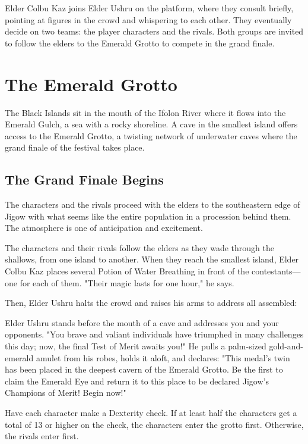 \documentclass[10pt,a4paper,twoside,fancy,bg=print,twocolumn,openany,nodeprecatedcode]{dndbook}
\begin{document}
Elder Colbu Kaz joins Elder Ushru on the platform, where they consult briefly, pointing at figures in the crowd and whispering to each other. They eventually decide on two teams: the player characters and the rivals. Both groups are invited to follow the elders to the Emerald Grotto to compete in the grand finale.

\section{The Emerald Grotto}
The Black Islands sit in the mouth of the Ifolon River where it flows into the Emerald Gulch, a sea with a rocky shoreline. A cave in the smallest island offers access to the Emerald Grotto, a twisting network of underwater caves where the grand finale of the festival takes place.

\subsection{The Grand Finale Begins}
The characters and the rivals proceed with the elders to the southeastern edge of Jigow with what seems like the entire population in a procession behind them. The atmosphere is one of anticipation and excitement.

The characters and their rivals follow the elders as they wade through the shallows, from one island to another. When they reach the smallest island, Elder Colbu Kaz places several Potion of Water Breathing in front of the contestants—one for each of them. "Their magic lasts for one hour," he says.

Then, Elder Ushru halts the crowd and raises his arms to address all assembled:

\begin{DndReadAloud}{}
Elder Ushru stands before the mouth of a cave and addresses you and your opponents. "You brave and valiant individuals have triumphed in many challenges this day; now, the final Test of Merit awaits you!" He pulls a palm-sized gold-and-emerald amulet from his robes, holds it aloft, and declares: "This medal's twin has been placed in the deepest cavern of the Emerald Grotto. Be the first to claim the Emerald Eye and return it to this place to be declared Jigow's Champions of Merit! Begin now!"

\end{DndReadAloud}

Have each character make a Dexterity check. If at least half the characters get a total of 13 or higher on the check, the characters enter the grotto first. Otherwise, the rivals enter first.
\end{document}
